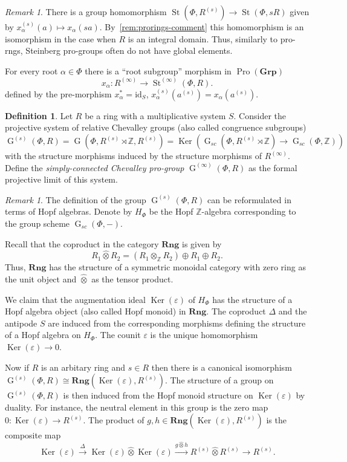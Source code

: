 \documentclass{article}
\numberwithin{equation}{section}
\theoremstyle{definition}
\newtheorem{df}[lemma]{Definition} \Crefname{df}{Definition}{Definitions}
\theoremstyle{remark}
\newtheorem{rem}[lemma]{Remark}
\DeclareMathOperator\St{St}
\DeclareMathOperator\Ker{Ker}
\DeclareMathOperator\GG{G}
\DeclareMathOperator{\Pro}{Pro}
\newcommand{\Group}{\mathbf{Grp}}
\newcommand{\Rng}{\mathbf{Rng}}
\newcommand{\ZZ}{\mathbb{Z}}
\newcommand{\otimeshat}{\mathbin{\widehat{\otimes}}}
\begin{document}
\begin{rem} \label{rem:pro-Steinberg-comment}
There is a group homomorphism $\St(\Phi, R^{(s)}) \to \St(\Phi, sR)$ given by $x_\alpha^{(s)}(a)\mapsto x_\alpha(sa)$. By~\cref{rem:prorings-comment} this homomorphism is an isomorphism in the case when $R$ is an integral domain. Thus, similarly to pro-rngs, Steinberg pro-groups often do not have global elements.
\end{rem}
 
For every root $\alpha \in \Phi$ there is a ``root subgroup'' morphism in $\Pro(\Group)$
\[x_{\alpha} \colon R^{(\infty)} \to \St^{(\infty)}(\Phi, R).\] 
defined by the pre-morphism $x_\alpha^* = \mathrm{id}_S$, $x_\alpha^{(s)}(a^{(s)}) = x_\alpha(a^{(s)})$.

\begin{df}
 Let $R$ be a ring with a multiplicative system $S$.
 Consider the projective system of relative Chevalley groups (also called congruence subgroups) 
 \[\GG^{(s)}(\Phi, R) = \GG(\Phi, R^{(s)} \rtimes \ZZ, R^{(s)}) = \Ker\left(\GG_{sc}(\Phi, R^{(s)} \rtimes \ZZ) \to \GG_{sc}(\Phi, \ZZ)\right)\] with the structure morphisms induced by the structure morphisms of \(R^{(\infty)}\). Define the {\it simply-connected Chevalley pro-group} $\GG^{(\infty)}(\Phi, R)$ as the formal projective limit of this system.
\end{df}

\begin{rem}
 The definition of the group $\GG^{(s)}(\Phi, R)$ can be reformulated in terms of Hopf algebras. Denote by \(H_\Phi\) be the Hopf \(\ZZ\)-algebra corresponding to the group scheme \(\GG_{sc}(\Phi, -)\).
 
 Recall that the coproduct in the category $\Rng$ is given by \[R_1 \otimeshat R_2 = (R_1 \otimes_{\ZZ} R_2) \oplus R_1 \oplus R_2.\]
 Thus, $\Rng$ has the structure of a symmetric monoidal category with zero ring as the unit object and $\otimeshat$ as the tensor product.
 
 We claim that the augmentation ideal \(\Ker(\varepsilon)\) of $H_\Phi$ has the structure of a Hopf algebra object (also called Hopf monoid) in \(\Rng\). The coproduct $\Delta$ and the antipode $S$ are induced from the corresponding morphisms defining the structure of a Hopf algebra on $H_\Phi$. The counit $\varepsilon$ is the unique homomorphism $\Ker(\varepsilon) \to 0$.
 
 Now if $R$ is an arbitary ring and $s \in R$ then there is a canonical isomorphism \(\GG^{(s)}(\Phi, R) \cong \Rng(\Ker(\varepsilon), R^{(s)})\). The structure of a group on $\GG^{(s)}(\Phi, R)$ is then induced from the Hopf monoid structure on $\Ker(\varepsilon)$ by duality.
 For instance, the neutral element in this group is the zero map \(0 \colon \Ker(\varepsilon) \to R^{(s)}\). The product of \(g, h \in \Rng(\Ker(\varepsilon), R^{(s)})\) is the composite map
 \[\Ker(\varepsilon) \xrightarrow{\Delta} \Ker(\varepsilon) \otimeshat \Ker(\varepsilon) \xrightarrow{g \otimeshat h} R^{(s)} \otimeshat R^{(s)} \to R^{(s)}.\]
\end{rem}
\end{document}
